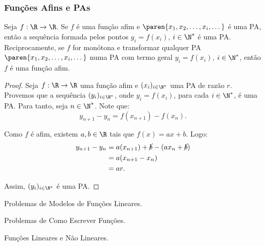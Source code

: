 \subsubsection{Funções Afins e PAs}

\begin{proposition}
Seja  $f: \R \to \R$. Se $f$ é uma função afim e $\paren{x_1, x_2,
\dots , x_i, \dots}$ é uma PA, então a sequência formada pelos
pontos $y_i = f(x_i)$, $i \in \N^*$ é uma PA. Reciprocamente,
se $f$ for monótona e transformar qualquer PA $\paren{x_1, x_2,
\dots , x_i, \dots}$ numa PA com termo geral $y_i = f(x_i)$, $i \in
\N^*$, então $f$ é uma função afim.    
\end{proposition}

\begin{proof}
    Seja $f: \R \to \R$ uma função afim e $(x_i)_{i\in\N^*}$ uma PA de razão $r$. 
    Provemos que a sequência $(y_i)_{i\in\N^*}$, onde $y_i = f(x_i)$, para cada $i \in \N^*$, 
    é uma PA.
    Para tanto, seja $n \in \N^*$. 
    Note que:
    \[
        y_{n+1}-y_n = f(x_{n+1})-f(x_n).
    \]

    Como $f$ é afim, existem $a,b\in\R$ tais que $f(x)=ax+b$.
    Logo:
    \begin{align*}
        y_{n+1}-y_n &= a(x_{n+1})+\cancel b - (ax_n+\cancel b) \\ &= a(x_{n+1}-x_n) \\ &= ar.
    \end{align*}
    
    Assim, $(y_i)_{i\in\N^*}$ é uma PA.
\end{proof}

\begin{onlineact}
    {Problemas de Modelos de Funções Lineares}.
\end{onlineact}

\begin{onlineact}
    {Problemas de Como Escrever Funções}.
\end{onlineact}

\begin{onlineact}
    {Funções Lineares e Não Lineares}.
\end{onlineact}